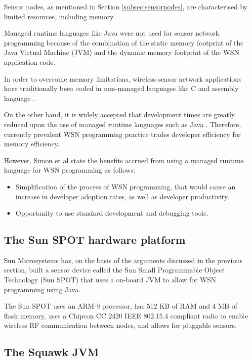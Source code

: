 Sensor nodes, as mentioned in Section \ref{subsec:sensornodes}, are
characterised by limited resources, including memory.
 
Managed runtime languages like Java were not used for sensor network programming
because of the combination of the static memory footprint of the Java Virtual
Machine (JVM) and the dynamic memory footprint of the WSN application code.

In order to overcome
memory limitations, wireless sensor network applications have traditionally been
 coded in non-managed languages like C and assembly language
 \cite{simon_squawk:2006}. 
 
 On the other hand, it is widely accepted that development times are greatly reduced
upon the use of managed runtime languages such as Java
\cite{simon_squawk:2006}. Therefore, currently prevalent WSN programming practice
trades developer efficiency for memory efficiency. 

However, Simon et al \cite{simon_squawk:2006} state the benefits accrued from
using a managed runtime language for WSN programming as follows:

\begin{itemize}
  \item Simplification of the process of WSN programming, that would cause an
  increase in developer adoption rates, as well as developer productivity.
  \item Opportunity to use standard development and debugging tools.
\end{itemize}
 
\subsection{The Sun SPOT hardware platform }
Sun Microsystems has, on the basis of the arguments discussed in the previous
section, built a sensor device
called the Sun Small Programmable Object Technology (Sun SPOT) that uses a
on-board JVM to allow for WSN programming using Java.

The Sun SPOT uses an ARM-9 processor, has 512 KB of RAM and 4 MB of flash
memory, uses a Chipcon CC 2420 IEEE 802.15.4 compliant radio to enable
wireless RF communication between nodes, and allows for pluggable sensors.

\subsection{The Squawk JVM}

